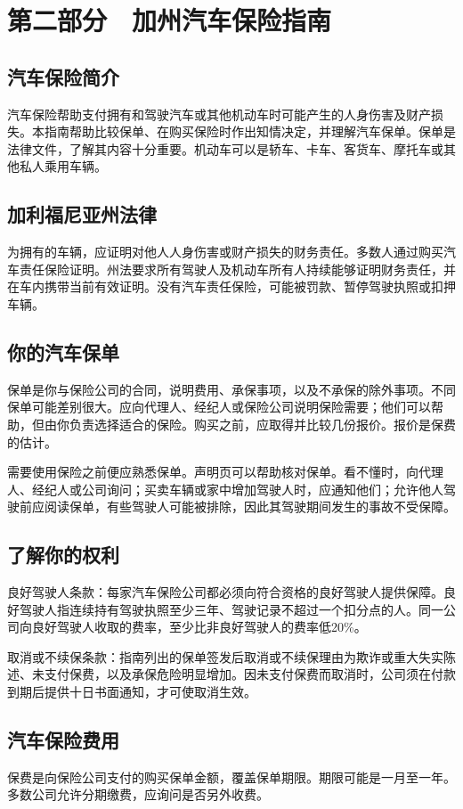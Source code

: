 \documentclass[UTF8,fontset=none,11pt,a4paper]{ctexart}
\begin{document}
\section*{第二部分　加州汽车保险指南}
\subsection*{汽车保险简介}
汽车保险帮助支付拥有和驾驶汽车或其他机动车时可能产生的人身伤害及财产损失。本指南帮助比较保单、在购买保险时作出知情决定，并理解汽车保单。保单是法律文件，了解其内容十分重要。机动车可以是轿车、卡车、客货车、摩托车或其他私人乘用车辆。


\subsection*{加利福尼亚州法律}
为拥有的车辆，应证明对他人人身伤害或财产损失的财务责任。多数人通过购买汽车责任保险证明。州法要求所有驾驶人及机动车所有人持续能够证明财务责任，并在车内携带当前有效证明。没有汽车责任保险，可能被罚款、暂停驾驶执照或扣押车辆。


\subsection*{你的汽车保单}
保单是你与保险公司的合同，说明费用、承保事项，以及不承保的除外事项。不同保单可能差别很大。应向代理人、经纪人或保险公司说明保险需要；他们可以帮助，但由你负责选择适合的保险。购买之前，应取得并比较几份报价。报价是保费的估计。


需要使用保险之前便应熟悉保单。声明页可以帮助核对保单。看不懂时，向代理人、经纪人或公司询问；买卖车辆或家中增加驾驶人时，应通知他们；允许他人驾驶前应阅读保单，有些驾驶人可能被排除，因此其驾驶期间发生的事故不受保障。


\subsection*{了解你的权利}
良好驾驶人条款：每家汽车保险公司都必须向符合资格的良好驾驶人提供保障。良好驾驶人指连续持有驾驶执照至少三年、驾驶记录不超过一个扣分点的人。同一公司向良好驾驶人收取的费率，至少比非良好驾驶人的费率低20\%。


取消或不续保条款：指南列出的保单签发后取消或不续保理由为欺诈或重大失实陈述、未支付保费，以及承保危险明显增加。因未支付保费而取消时，公司须在付款到期后提供十日书面通知，才可使取消生效。


\subsection*{汽车保险费用}
保费是向保险公司支付的购买保单金额，覆盖保单期限。期限可能是一月至一年。多数公司允许分期缴费，应询问是否另外收费。
\end{document}
